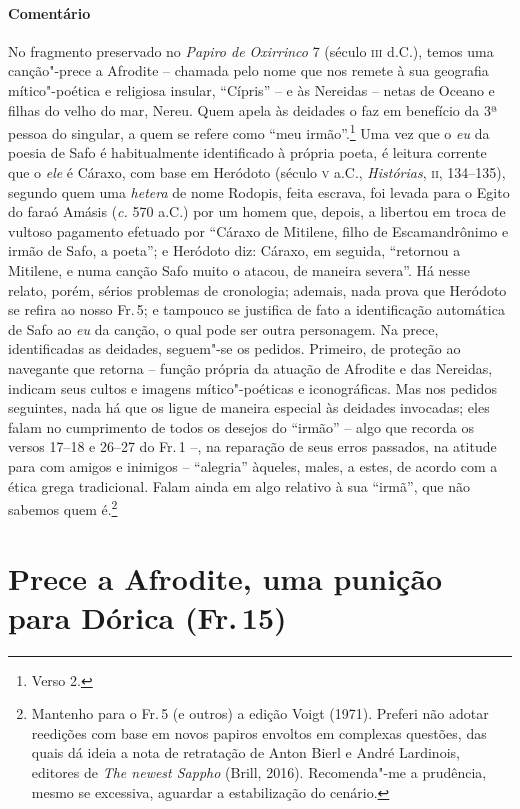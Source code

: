\pagebreak
{\paragraph{Comentário} No fragmento preservado no \textit{Papiro de Oxirrinco} 7 (século \textsc{iii} d.C.),
temos uma canção"-prece a Afrodite -- chamada pelo nome que nos remete à sua
geografia mítico"-poética e religiosa insular, ``Cípris'' -- e às Nereidas
-- netas de Oceano e filhas do velho do mar, Nereu. Quem apela às deidades o faz
em benefício da 3ª pessoa do singular, a quem se refere como ``meu
irmão''.\footnote{Verso 2.} Uma vez que o \textit{eu} da poesia de Safo é habitualmente
identificado à própria poeta, é leitura corrente que o \textit{ele} é Cáraxo, com base
em Heródoto (século \textsc{v} a.C., \textit{Histórias}, \textsc{ii}, 134--135), segundo quem uma
\textit{hetera} de nome Rodopis, feita escrava, foi levada para o Egito do faraó Amásis
(\textit{c.} 570 a.C.) por um homem que, depois, a libertou em troca de vultoso
pagamento efetuado por ``Cáraxo de Mitilene, filho de Escamandrônimo e
irmão de Safo, a poeta''; e Heródoto diz: Cáraxo, em seguida, ``retornou
a Mitilene, e numa canção Safo muito o atacou, de maneira severa''. Há nesse
relato, porém, sérios problemas de cronologia; ademais, nada prova que Heródoto se refira ao
nosso Fr.\,5; e tampouco se justifica de fato a identificação automática de
Safo ao \textit{eu} da canção, o qual pode ser outra personagem.
Na prece, identificadas as deidades, seguem"-se os
pedidos. Primeiro, de proteção ao navegante que retorna -- função própria da
atuação de Afrodite e das Nereidas, indicam seus cultos e imagens
mítico"-poéticas e iconográficas. Mas nos pedidos seguintes, nada há que os
ligue de maneira especial às deidades invocadas; eles falam no
cumprimento de todos os desejos do ``irmão'' -- algo que recorda os
versos 17--18 e 26--27 do Fr.\,1 --, na reparação de seus erros passados, na
atitude para com amigos e inimigos -- ``alegria'' àqueles,
males, a estes, de acordo com a ética grega tradicional. Falam ainda em algo
relativo à sua ``irmã'', que não sabemos quem é.\footnote{Mantenho para o Fr.\,5 (e outros) a edição Voigt (1971). Preferi não adotar reedições com base em novos papiros envoltos em complexas questões, das quais dá ideia a nota de retratação de Anton Bierl e André Lardinois, editores de \textit{The newest Sappho} (Brill, 2016). Recomenda"-me a prudência, mesmo se excessiva, aguardar a estabilização do cenário.}}


\pagebreak
\section[Prece a Afrodite, uma punição para Dórica (Fr.\,15)]{Prece a Afrodite, uma punição\\para Dórica (Fr.\,15)}

